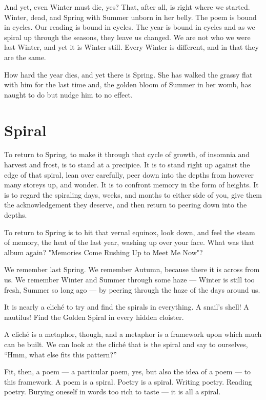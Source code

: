 \documentclass[12pt,oneside]{memoir}
\begin{document}
And yet, even Winter must die, yes? That, after all, is right where we started. Winter, dead, and Spring with Summer unborn in her belly. The poem is bound in cycles. Our reading is bound in cycles. The year is bound in cycles and as we spiral up through the seasons, they leave us changed. We are not who we were last Winter, and yet it is Winter still. Every Winter is different, and in that they are the same.

How hard the year dies, and yet there is Spring. She has walked the grassy flat with him for the last time and, the golden bloom of Summer in her womb, has naught to do but nudge him to no effect.


\section*{Spiral}

To return to Spring, to make it through that cycle of growth, of insomnia and harvest and frost, is to stand at a precipice. It is to stand right up against the edge of that spiral, lean over carefully, peer down into the depths from however many storeys up, and wonder. It is to confront memory in the form of heights. It is to regard the spiraling days, weeks, and months to either side of you, give them the acknowledgement they deserve, and then return to peering down into the depths.

To return to Spring is to hit that vernal equinox, look down, and feel the steam of memory, the heat of the last year, washing up over your face. What was that album again? "Memories Come Rushing Up to Meet Me Now"?

We remember last Spring. We remember Autumn, because there it is across from us. We remember Winter and Summer through some haze --- Winter is still too fresh, Summer so long ago --- by peering through the haze of the days around us.

It is nearly a cliché to try and find the spirals in everything. A snail's shell! A nautilus! Find the Golden Spiral in every hidden cloister.

A cliché is a metaphor, though, and a metaphor is a framework upon which much can be built. We can look at the cliché that is the spiral and say to ourselves, ``Hmm, what else fits this pattern?''

Fit, then, a poem --- a particular poem, yes, but also the idea of a poem --- to this framework. A poem is a spiral. Poetry is a spiral. Writing poetry. Reading poetry. Burying oneself in words too rich to taste --- it is all a spiral.
\end{document}
